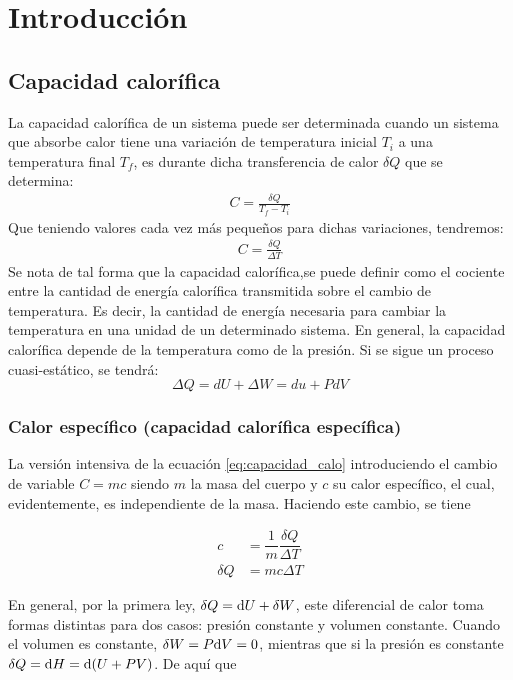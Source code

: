 \section{Introducción}
\subsection{Capacidad calorífica}
La capacidad calorífica de un sistema puede ser determinada cuando un sistema que absorbe calor tiene una variación de temperatura inicial $T_i$ a una temperatura final $T_f$, es durante dicha transferencia de calor $\delta Q$ que se determina:
\begin{align}
    C=\frac{\delta Q}{T_f-T_i}
\end{align}
Que teniendo valores cada vez más pequeños para dichas variaciones, tendremos:
\begin{align}
    C=\frac{\delta Q}{\Delta T}
\end{align}
Se nota de tal forma que  la capacidad calorífica,se puede definir como el cociente entre la cantidad de energía calorífica transmitida sobre el cambio de temperatura. Es decir, la cantidad de energía necesaria para cambiar la temperatura en una unidad de un determinado sistema.\cite{juleve}
En general, la capacidad calorífica depende de la temperatura como de la presión. Si se sigue un proceso cuasi-estático, se tendrá:
\begin{equation}
    \Delta Q= dU+\Delta W=du+PdV
\end{equation}


\subsubsection{Calor específico (capacidad calorífica específica)}
La versión intensiva de la ecuación \eqref{eq:capacidad_calo} introduciendo el cambio de variable $C=mc$ siendo $m$ la masa del cuerpo y $c$ su calor específico, el cual, evidentemente, es independiente de la masa. Haciendo este cambio, se tiene

\begin{equation}
    \begin{aligned}
        c &= \dfrac{1}{m}\dfrac{\delta Q}{\Delta T} \\
        \delta Q &= m c \Delta T
    \end{aligned}
\end{equation}

En general, por la primera ley, $\delta Q = \text d{U} + \delta W$, este diferencial de calor toma formas distintas para dos casos: presión constante y volumen constante. Cuando el volumen es constante, $\delta W = P\text d V = 0$, mientras que si la presión es constante $\delta Q = \text d H = \text d{(U + PV)}$. De aquí que

